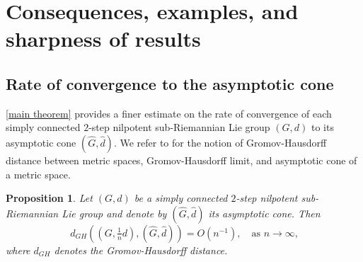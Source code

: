 \documentclass[a4paper,11pt,reqno]{amsart}
\theoremstyle{plain}
\newtheorem{corollary}[theorem]{Corollary}
\newtheorem{proposition}[theorem]{Proposition}
\theoremstyle{definition}
\newcommand{\de}{\mathrm{d}}
\begin{document}

\section{Consequences, examples, and sharpness of results} \label{consequences}

\subsection{Rate of convergence to the asymptotic cone} \cref{main theorem} provides a finer estimate on the rate of convergence of each simply connected $2$-step nilpotent sub-Riemannian Lie group $(G,d)$ to its asymptotic cone $(\widehat{G},\widehat{d})$. We refer to \cite[Chapters 7,8]{MR1835418} for the notion of Gromov-Hausdorff distance between metric spaces, Gromov-Hausdorff limit, and asymptotic cone of a metric space.

\begin{proposition} \label{prop_rate_convergence}
 Let $(G,d)$ be a simply connected $2$-step nilpotent sub-Riemannian Lie group and denote by $(\widehat{G},\widehat{d})$ its asymptotic cone. Then
 \begin{equation} \label{rate_convergence}
 d_{GH}\left((G,\tfrac{1}{n}d),(\widehat{G},\widehat{d})\right) = O(n^{-1}), \quad \text{as $n \to\infty$,}
 \end{equation}
 where $d_{GH}$ denotes the Gromov-Hausdorff distance.
\end{proposition}
\end{document}
